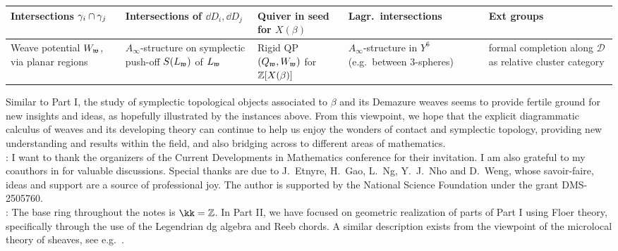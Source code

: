 \begin{center}
\begin{table}
\begin{tabular}{ |P{3cm}|P{4cm}|P{3cm}|P{3.5cm}|P{3.5cm}|}
	\hline

    
    
	Intersections $\gamma_i\cap\gamma_j$ & Intersections of $\dd D_i,\dd D_j$ & Quiver in seed for $X(\beta)$ & Lagr.~intersections & Ext groups \\
	\hline

    Weave potential $W_{\mathfrak{w}}$, via planar regions & $A_\infty$-structure on symplectic push-off $S(L_{\mathfrak{w}})$ of $L_{\mathfrak{w}}$ & Rigid QP $(Q_{\mathfrak{w}},W_{\mathfrak{w}})$ for $\mathbb{Z}[X(\beta)]$ & $A_\infty$-structure in $Y^6$ (e.g.~between 3-spheres) & formal completion along $\mathcal{D}$ as relative cluster category \\

    \hline
\end{tabular}
\end{table}
\end{center}
\normalsize

Similar to Part I, the study of symplectic topological objects associated to $\beta$ and its Demazure weaves seems to provide fertile ground for new insights and ideas, as hopefully illustrated by the instances above. From this viewpoint, we hope that the explicit diagrammatic calculus of weaves and its developing theory can continue to help us enjoy the wonders of contact and symplectic topology, providing new understanding and results within the field, and also bridging across to different areas of mathematics.\\

: I want to thank the organizers of the Current Developments in Mathematics conference for their invitation. I am also grateful to my coauthors in \cite{CasalsZaslow,CGGLSS25,CasalsChrist,casals2023demazureweavesreducedplabic,CasalsLi24} for valuable discussions. Special thanks are due to J.~Etnyre, H.~Gao, L.~Ng, Y.~J.~Nho and D.~Weng, whose savoir-faire, ideas and support are a source of professional joy. The author is supported by the National Science Foundation under the grant DMS-2505760.\sbs\\


: The base ring throughout the notes is $\kk=\Z$. In Part II, we have focused on geometric realization of parts of Part I using Floer theory, specifically through the use of the Legendrian dg algebra and Reeb chords. A similar description exists from the viewpoint of the microlocal theory of sheaves, see e.g.~\cite{CasalsZaslow,CasalsWeng22,casals2023demazureweavesreducedplabic}.\sbs\\

